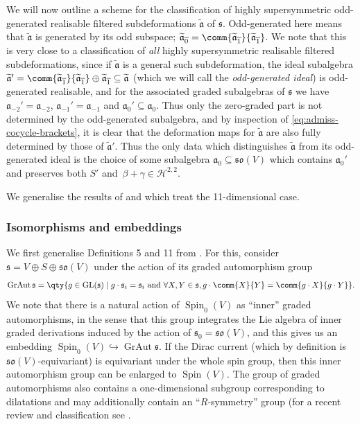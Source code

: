 \documentclass[pdftex]{sigma}
\numberwithin{equation}{section}
\newcommand{\fa}{\mathfrak{a}}
\newcommand{\fs}{\mathfrak{s}}
\newcommand{\fso}{\mathfrak{so}}
\newcommand{\cH}{\mathcal{H}}
\newcommand{\fatilde}{\widetilde{\fa}}
\newcommand{\1}{\mathbbm{1}}
\DeclareMathOperator{\GL}{GL}
\DeclareMathOperator{\Spin}{Spin}
\DeclareMathOperator{\GrAut}{GrAut}
\begin{document}
We will now outline a scheme for the classification of highly supersymmetric odd-generated realisable filtered subdeformations $\fatilde$ of $\fs$. Odd-generated here means that $\fatilde$ is generated by its odd subspace; $\fatilde_{\overline{0}}=\comm{\fatilde_{\overline{1}}}{\fatilde_{\overline{1}}}$. We note that this is very close to a classification of \emph{all} highly supersymmetric realisable filtered subdeformations, since if $\fatilde$ is a general such subdeformation, the ideal subalgebra $\fatilde'=\comm{\fatilde_{\overline{1}}}{\fatilde_{\overline{1}}}\oplus\fatilde_{\overline{1}}\subseteq\fatilde$ (which we will call the \emph{odd-generated ideal}) is odd-generated realisable, and for the associated graded subalgebras of $\fs$ we have $\fa_{-2}'=\fa_{-2}$, ${\fa_{-1}'=\fa_{-1}}$ and $\fa_0'\subseteq\fa_0$. Thus only the zero-graded part is not determined by the odd-generated subalgebra, and by inspection of \eqref{eq:admiss-cocycle-brackets}, it is clear that the deformation maps for $\fatilde$ are also fully determined by those of $\fatilde'$. Thus the only data which distinguishes $\fatilde$ from its odd-generated ideal is the choice of some subalgebra $\fa_0\subseteq\fso(V)$ which contains $\fa_0'$ and preserves both $S'$ and~${\beta+\gamma\in\cH^{2,2}}$.

We generalise the results of \cite[Section~4]{Figueroa-OFarrill2017_1} and \cite[Section~5]{Santi2022} which treat the 11-dimensional case.

\subsubsection{Isomorphisms and embeddings}

We first generalise Definitions 5 and 11 from \cite{Figueroa-OFarrill2017_1}. For this, consider $\fs=V\oplus S\oplus\fso(V)$ under the action of its graded automorphism group
\[
	\GrAut\fs = \qty{ g\in\GL(\fs)\mid g\cdot\fs_i = \fs_i \text{ and } \forall X,Y\in\fs, g\cdot\comm{X}{Y}=\comm{g\cdot X}{g\cdot Y}}.
\]
We note that there is a natural action of $\Spin_0(V)$ as ``inner'' graded automorphisms, in the sense that this group integrates the Lie algebra of inner graded derivations induced by the action of $\fs_0=\fso(V)$, and this gives us an embedding $\Spin_0(V)\hookrightarrow \GrAut\fs$.
If the Dirac current (which by definition is $\fso(V)$-equivariant) is equivariant under the whole spin group, then this inner automorphism group can be enlarged to $\Spin(V)$. The group of graded automorphisms also contains a one-dimensional subgroup corresponding to dilatations and may additionally contain an ``$R$-symmetry'' group (for a recent review and classification see \cite{Gall2021}.
\end{document}
